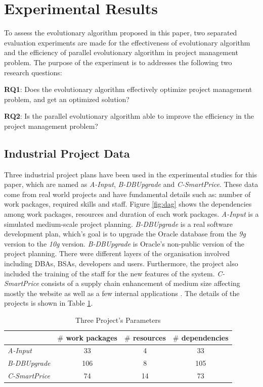 %
%
\newcommand{\projectA}[0]{\emph{A-Input}}
\newcommand{\projectB}[0]{\emph{B-DBUpgrade}}
\newcommand{\projectC}[0]{\emph{C-SmartPrice}}

\section{Experimental Results}
%
To assess the evolutionary algorithm proposed in this paper, two separated
evaluation experiments are made for the effectiveness of evolutionary algorithm
and the efficiency of parallel evolutionary algorithm in project management
problem. The purpose of the experiment is to addresses the following two
research questions:

\textbf{RQ1}: Does the evolutionary algorithm effectively optimize project
management problem, and get an optimized solution?

\textbf{RQ2}: Is the parallel evolutionary algorithm able to improve the
efficiency in the project management problem?


\subsection{Industrial Project Data}
%
Three industrial project plans have been used in the experimental studies for
this paper, which are named as \projectA{}, \projectB{} and \projectC{}. These
data come from real world projects and have fundamental details such as: number
of work packages, required skills and staff.  Figure \ref{fig:dag} shows the
dependencies among work packages, resources and duration of each work
packages. \projectA{} is a simulated medium-scale project planning. \projectB{}
is a real software development plan, which's goal is to upgrade the Oracle
database from the \emph{9g} version to the \emph{10g} version. \projectB{} is
Oracle's non-public version of the project planning. There were different layers
of the organisation involved including DBAs, BSAs, developers and users.
Furthermore, the project also included the training of the staff for the new
features of the system. \projectC{} consists of a supply chain enhancement of
medium size affecting mostly the website as well as a few internal applications
\cite{ren2}. The details of the projects is shown in Table \ref{tab:statis}.
% 
\begin{table}[!ht]
  \centering
  \caption{Three Project's Parameters}
  \label{tab:statis}
  \begin{tabular}{lccc}
    \hline
      & $\#$ work packages & $\#$ resources & $\#$ dependencies \\
    \hline
    \projectA{} & 33  & 4  & 33  \\
    \projectB{} & 106 & 8  & 105 \\
    \projectC{} & 74  & 14 & 73  \\
    \hline
  \end{tabular}
\end{table}



